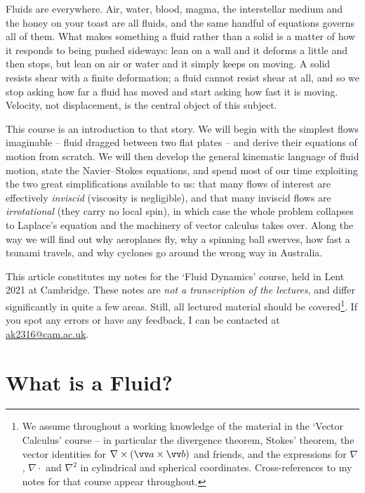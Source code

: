 



Fluids are everywhere. Air, water, blood, magma, the interstellar medium and the honey on your toast are all fluids, and the same handful of equations governs all of them. What makes something a fluid rather than a solid is a matter of how it responds to being pushed sideways: lean on a wall and it deforms a little and then stops, but lean on air or water and it simply keeps on moving. A solid resists shear with a finite deformation; a fluid cannot resist shear at all, and so we stop asking how far a fluid has moved and start asking how fast it is moving. Velocity, not displacement, is the central object of this subject.

This course is an introduction to that story. We will begin with the simplest flows imaginable -- fluid dragged between two flat plates -- and derive their equations of motion from scratch. We will then develop the general kinematic language of fluid motion, state the Navier--Stokes equations, and spend most of our time exploiting the two great simplifications available to us: that many flows of interest are effectively \emph{inviscid} (viscosity is negligible), and that many inviscid flows are \emph{irrotational} (they carry no local spin), in which case the whole problem collapses to Laplace's equation and the machinery of vector calculus takes over. Along the way we will find out why aeroplanes fly, why a spinning ball swerves, how fast a tsunami travels, and why cyclones go around the wrong way in Australia.

This article constitutes my notes for the `Fluid Dynamics' course, held in Lent 2021 at Cambridge. These notes are \emph{not a transcription of the lectures}, and differ significantly in quite a few areas. Still, all lectured material should be covered\footnote{We assume throughout a working knowledge of the material in the `Vector Calculus' course -- in particular the divergence theorem, Stokes' theorem, the vector identities for $\nabla \times (\vv a \times \vv b)$ and friends, and the expressions for $\nabla$, $\nabla \cdot$ and $\nabla^2$ in cylindrical and spherical coordinates. Cross-references to my notes for that course appear throughout.}. If you spot any errors or have any feedback, I can be contacted at \href{mailto:ak2316@cam.ac.uk}{ak2316@cam.ac.uk}.



\section{What is a Fluid?}

